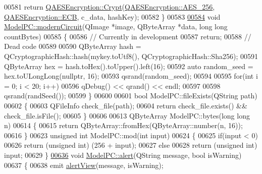 \begin{DoxyCode}
00581     \textcolor{keywordflow}{return} \hyperlink{class_q_a_e_s_encryption_a43819eeb6a7cb29fbd3cb6ad640dcbdf}{QAESEncryption::Crypt}(\hyperlink{class_q_a_e_s_encryption_abe48208f4f6c7d68e6a10b49b9d0b7bdacde97774ab1d4c609e04b0dd13a1e1f7}{QAESEncryption::AES\_256}, 
      \hyperlink{class_q_a_e_s_encryption_ad3e031c49a3d56566379d75b40b7b255a4ca7f51778e2adf1f464164a0ba8e75e}{QAESEncryption::ECB}, c\_data, hashKey);
00582 \}
00583 
\hypertarget{modelpc_8cpp_source_l00584}{}\hyperlink{class_model_p_c_a670c3a08360555282adfd3740b2debac}{00584} \textcolor{keywordtype}{void} \hyperlink{class_model_p_c_a670c3a08360555282adfd3740b2debac}{ModelPC::modernCircuit}(QImage *image, QByteArray *data, \textcolor{keywordtype}{long} \textcolor{keywordtype}{long} countBytes)
00585 \{
00586     \textcolor{comment}{// Currently in development}
00587     \textcolor{keywordflow}{return};
00588     \textcolor{comment}{// Dead code}
00589 
00590     QByteArray hash = QCryptographicHash::hash(mykey.toUtf8(), QCryptographicHash::Sha256);
00591     QByteArray hex = hash.toHex().toUpper().left(16);
00592     \textcolor{keyword}{auto} random\_seed = hex.toULongLong(\textcolor{keyword}{nullptr}, 16);
00593     qsrand(random\_seed);
00594 
00595     \textcolor{keywordflow}{for}(\textcolor{keywordtype}{int} i = 0; i < 20; i++)
00596         qDebug() << qrand() << endl;
00597 
00598     qsrand(randSeed());
00599 \}
00600 
00601 \textcolor{keywordtype}{bool} ModelPC::fileExists(QString path)
00602 \{
00603     QFileInfo check\_file(path);
00604     \textcolor{keywordflow}{return} check\_file.exists() && check\_file.isFile();
00605 \}
00606 
00613 QByteArray ModelPC::bytes(\textcolor{keywordtype}{long} \textcolor{keywordtype}{long} n)
00614 \{
00615     \textcolor{keywordflow}{return} QByteArray::fromHex(QByteArray::number(n, 16));
00616 \}
00623 \textcolor{keywordtype}{unsigned} \textcolor{keywordtype}{int} ModelPC::mod(\textcolor{keywordtype}{int} input)
00624 \{
00625     \textcolor{keywordflow}{if}(input < 0)
00626         \textcolor{keywordflow}{return} (\textcolor{keywordtype}{unsigned} \textcolor{keywordtype}{int}) (256 + input);
00627     \textcolor{keywordflow}{else}
00628         \textcolor{keywordflow}{return} (\textcolor{keywordtype}{unsigned} \textcolor{keywordtype}{int}) input;
00629 \}
\hypertarget{modelpc_8cpp_source_l00636}{}\hyperlink{class_model_p_c_a9079a101d83672aa48fd2dbac797de40}{00636} \textcolor{keywordtype}{void} \hyperlink{class_model_p_c_a9079a101d83672aa48fd2dbac797de40}{ModelPC::alert}(QString message, \textcolor{keywordtype}{bool} isWarning)
00637 \{
00638     emit \hyperlink{class_model_p_c_af0217a7ca5671e26090dc50a5dccdaf5}{alertView}(message, isWarning);

\end{DoxyCode}
